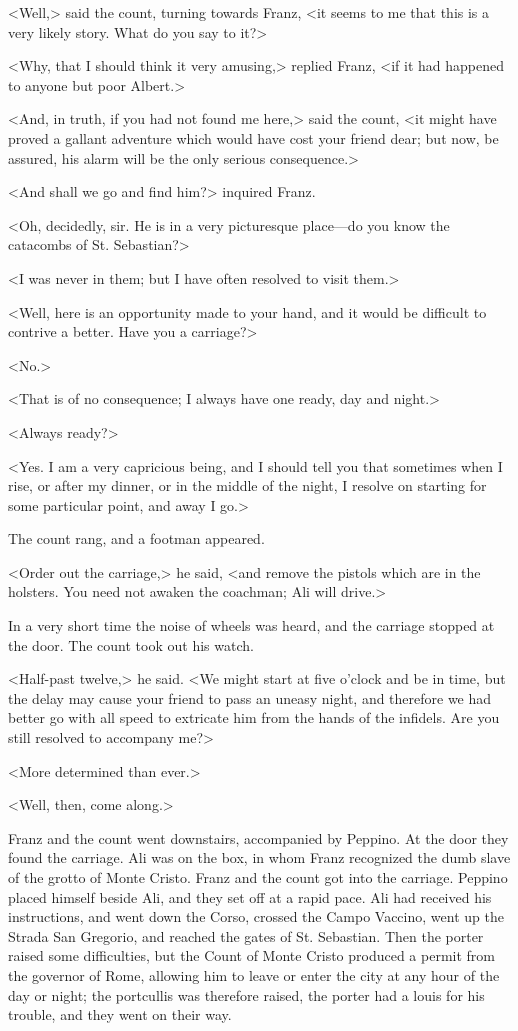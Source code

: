  <Well,> said the count, turning towards Franz, <it seems to me that this is a very likely story. What do you say to it?> 

 <Why, that I should think it very amusing,> replied Franz, <if it had happened to anyone but poor Albert.> 

 <And, in truth, if you had not found me here,> said the count, <it might have proved a gallant adventure which would have cost your friend dear; but now, be assured, his alarm will be the only serious consequence.> 

 <And shall we go and find him?> inquired Franz. 

 <Oh, decidedly, sir. He is in a very picturesque place—do you know the catacombs of St. Sebastian?> 

 <I was never in them; but I have often resolved to visit them.> 

 <Well, here is an opportunity made to your hand, and it would be difficult to contrive a better. Have you a carriage?> 

 <No.> 

 <That is of no consequence; I always have one ready, day and night.> 

 <Always ready?> 

 <Yes. I am a very capricious being, and I should tell you that sometimes when I rise, or after my dinner, or in the middle of the night, I resolve on starting for some particular point, and away I go.> 

 The count rang, and a footman appeared. 

 <Order out the carriage,> he said, <and remove the pistols which are in the holsters. You need not awaken the coachman; Ali will drive.> 

 In a very short time the noise of wheels was heard, and the carriage stopped at the door. The count took out his watch. 

 <Half-past twelve,> he said. <We might start at five o'clock and be in time, but the delay may cause your friend to pass an uneasy night, and therefore we had better go with all speed to extricate him from the hands of the infidels. Are you still resolved to accompany me?> 

 <More determined than ever.> 

 <Well, then, come along.> 

 Franz and the count went downstairs, accompanied by Peppino. At the door they found the carriage. Ali was on the box, in whom Franz recognized the dumb slave of the grotto of Monte Cristo. Franz and the count got into the carriage. Peppino placed himself beside Ali, and they set off at a rapid pace. Ali had received his instructions, and went down the Corso, crossed the Campo Vaccino, went up the Strada San Gregorio, and reached the gates of St. Sebastian. Then the porter raised some difficulties, but the Count of Monte Cristo produced a permit from the governor of Rome, allowing him to leave or enter the city at any hour of the day or night; the portcullis was therefore raised, the porter had a louis for his trouble, and they went on their way. 

